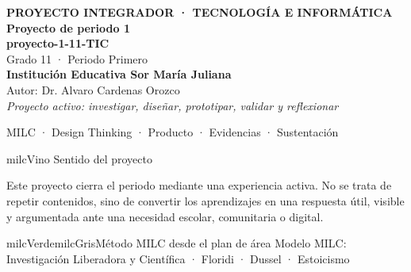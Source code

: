 \documentclass[11pt,letterpaper]{article}
\begin{document}
\thispagestyle{empty}

\vspace*{.85cm}
\begin{tcolorbox}[
  enhanced,colback=milcVino,colframe=milcVino,arc=12mm,width=.86\textwidth,
  boxrule=0pt,left=12mm,right=12mm,top=11mm,bottom=11mm,center,
  overlay={\draw[milcMagenta,line width=2pt,dash pattern=on 9pt off 8pt,rounded corners=10mm]
  ([xshift=7mm,yshift=-7mm]frame.north west) rectangle ([xshift=-7mm,yshift=7mm]frame.south east);}]
  \centering
  {\sffamily\bfseries\color{white}\fontsize{15}{17}\selectfont PROYECTO INTEGRADOR · TECNOLOGÍA E INFORMÁTICA}\\[1.0cm]
  {\sffamily\bfseries\color{white}\fontsize{30}{33}\selectfont Proyecto de periodo 1}\\[3mm]
  {\sffamily\bfseries\color{milcMostaza}\fontsize{25}{28}\selectfont proyecto-1-11-TIC}\\[8mm]
  {\sffamily\color{white}\Large Grado 11 · Periodo Primero}\\[1.0cm]
  {\sffamily\bfseries\color{white}\large Institución Educativa Sor María Juliana}\\[2mm]
  {\sffamily\color{white}Autor: Dr. Alvaro Cardenas Orozco}\\[4mm]
  {\sffamily\itshape\color{white}Proyecto activo: investigar, diseñar, prototipar, validar y reflexionar}
\end{tcolorbox}
\vfill
\begin{tcolorbox}[enhanced,colback=milcVino!72!black,colframe=milcVino!72!black,arc=5mm,boxrule=0pt,width=.86\textwidth,left=6mm,right=6mm,top=4mm,bottom=4mm,center]
{\color{white}\sffamily\small MILC · Design Thinking · Producto · Evidencias · Sustentación}
\end{tcolorbox}

\newpage
\begin{titlebox}{milcVino}
Sentido del proyecto
\end{titlebox}
\begin{multicols}{2}
Este proyecto cierra el periodo mediante una experiencia activa. No se trata de repetir contenidos, sino de convertir los aprendizajes en una respuesta útil, visible y argumentada ante una necesidad escolar, comunitaria o digital.

\columnbreak
\begin{softbox}{milcVerde}{milcGris}{Método MILC desde el plan de área}
Modelo MILC: Investigación Liberadora y Científica · Floridi · Dussel · Estoicismo
\end{softbox}
\end{multicols}
\end{document}
